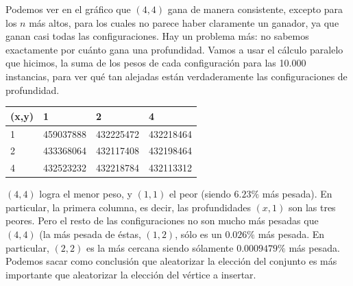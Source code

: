 \begin{figure}[H]
    \begin{minipage}[t]{\linewidth}
		\centering
		\label{fig:ejercicio-5-configuracion-profundidad-conjunto-1}
    \end{minipage}
\end{figure}
Podemos ver en el gráfico que $(4,4)$ gana de manera consistente, excepto para los $n$ más altos, para los cuales no parece haber claramente un ganador, ya que ganan casi todas las configuraciones. Hay un problema más: no sabemos exactamente por cuánto gana una profundidad. Vamos a usar el cálculo paralelo que hicimos, la suma de los pesos de cada configuración para las 10.000 instancias, para ver qué tan alejadas están verdaderamente las configuraciones de profundidad.
\begin{center}
    \begin{tabular}{ | l | l | l | l |}
    \hline
    (x,y)   & 1                 & 2                 & 4 \\ \hline
    1       & 459037888         & 432225472         & 432218464 \\ \hline
    2       & 433368064         & 432117408         & 432198464 \\ \hline
    4       & 432523232         & 432218784         & 432113312 \\
    \hline
    \end{tabular}
\end{center}
$(4,4)$ logra el menor peso, y $(1,1)$ el peor (siendo $6.23\%$ más pesada). En particular, la primera columna, es decir, las profundidades $(x,1)$ son las tres peores. Pero el resto de las configuraciones no son mucho más pesadas que $(4,4)$ (la más pesada de éstas, $(1,2)$, sólo es un $0.026\%$ más pesada. En particular, $(2,2)$ es la más cercana siendo sólamente $0.0009479\%$ más pesada. Podemos sacar como conclusión que aleatorizar la elección del conjunto es más importante que aleatorizar la elección del vértice a insertar.

